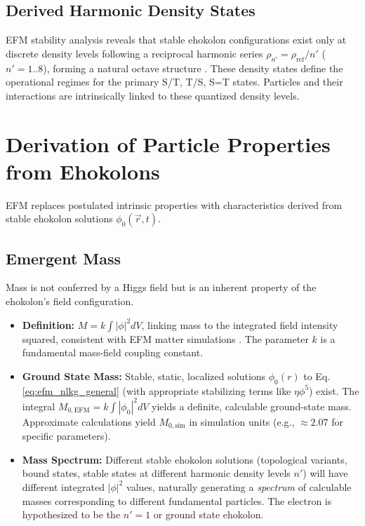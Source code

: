 \documentclass[11pt]{article}
\begin{document}
\subsection{Derived Harmonic Density States}
EFM stability analysis reveals that stable ehokolon configurations exist only at discrete density levels following a reciprocal harmonic series \(\rho_{n'} = \rho_{\text{ref}}/n'\) (\(n'=1..8\)), forming a natural octave structure \cite{EFM_Harmonic_Densities}. These density states define the operational regimes for the primary S/T, T/S, S=T states. Particles and their interactions are intrinsically linked to these quantized density levels.

\section{Derivation of Particle Properties from Ehokolons}
EFM replaces postulated intrinsic properties with characteristics derived from stable ehokolon solutions \(\phi_0(\vec{r}, t)\).

\subsection{Emergent Mass}
Mass is not conferred by a Higgs field but is an inherent property of the ehokolon's field configuration.
\begin{itemize}
    \item \textbf{Definition: } \(M = k \int |\phi|^2 dV\), linking mass to the integrated field intensity squared, consistent with EFM matter simulations \cite{EFM_Matter_Formation_2}. The parameter \(k\) is a fundamental mass-field coupling constant.
    \item \textbf{Ground State Mass: } Stable, static, localized solutions \(\phi_0(r)\) to Eq. \ref{eq:efm_nlkg_general} (with appropriate stabilizing terms like \(\eta\phi^5\)) exist. The integral \(M_{0, \text{EFM}} = k \int |\phi_0|^2 dV\) yields a definite, calculable ground-state mass. Approximate calculations \cite{Previous_Analysis_Placeholder} yield \(M_{0, \text{sim}}\) in simulation units (e.g., \(\approx 2.07\) for specific parameters).
    \item \textbf{Mass Spectrum: } Different stable ehokolon solutions (topological variants, bound states, stable states at different harmonic density levels \(n'\)) will have different integrated \(|\phi|^2\) values, naturally generating a \textit{spectrum} of calculable masses corresponding to different fundamental particles. The electron is hypothesized to be the \(n'=1\) or ground state ehokolon.
\end{itemize}
\end{document}

